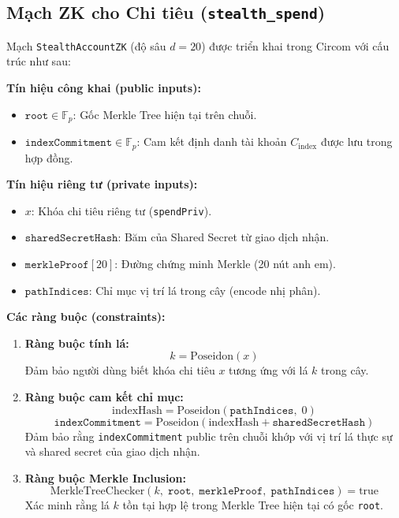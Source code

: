 \documentclass[../DoAn.tex]{subfiles}
\begin{document}
\subsection{Mạch ZK cho Chi tiêu (\texttt{stealth\_spend})}
\label{subsec:zk_spend}

Mạch \texttt{StealthAccountZK} (độ sâu \(d = 20\)) được triển khai trong Circom với cấu trúc như sau:

\textbf{Tín hiệu công khai (public inputs):}
\begin{itemize}
    \item \(\texttt{root} \in \mathbb{F}_p\): Gốc Merkle Tree hiện tại trên chuỗi.
    \item \(\texttt{indexCommitment} \in \mathbb{F}_p\): Cam kết định danh tài khoản \(C_{\text{index}}\) được lưu trong hợp đồng.
\end{itemize}

\textbf{Tín hiệu riêng tư (private inputs):}
\begin{itemize}
    \item \(x\): Khóa chi tiêu riêng tư (\texttt{spendPriv}).
    \item \(\texttt{sharedSecretHash}\): Băm của Shared Secret từ giao dịch nhận.
    \item \(\texttt{merkleProof}[20]\): Đường chứng minh Merkle (20 nút anh em).
    \item \(\texttt{pathIndices}\): Chỉ mục vị trí lá trong cây (encode nhị phân).
\end{itemize}

\textbf{Các ràng buộc (constraints):}

\begin{enumerate}
    \item \textbf{Ràng buộc tính lá:}
    \[
        k = \text{Poseidon}(x)
    \]
    Đảm bảo người dùng biết khóa chi tiêu \(x\) tương ứng với lá \(k\) trong cây.

    \item \textbf{Ràng buộc cam kết chỉ mục:}
    \[
        \text{indexHash} = \text{Poseidon}(\texttt{pathIndices},\; 0)
    \]
    \[
        \texttt{indexCommitment} = \text{Poseidon}(\text{indexHash} + \texttt{sharedSecretHash})
    \]
    Đảm bảo rằng \texttt{indexCommitment} public trên chuỗi khớp với vị trí lá thực sự và shared secret của giao dịch nhận.

    \item \textbf{Ràng buộc Merkle Inclusion:}
    \[
        \text{MerkleTreeChecker}(k,\; \texttt{root},\; \texttt{merkleProof},\; \texttt{pathIndices}) = \text{true}
    \]
    Xác minh rằng lá \(k\) tồn tại hợp lệ trong Merkle Tree hiện tại có gốc \texttt{root}.
\end{enumerate}
\end{document}
